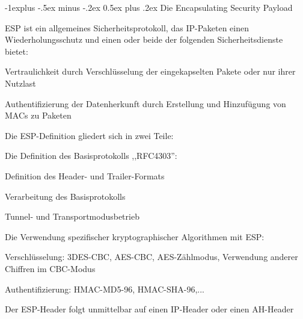 \documentclass[a4paper]{article}
\makeatletter
\renewcommand{\subsection}{\@startsection{subsection}{2}{0mm}%
 {-1explus -.5ex minus -.2ex}%
 {0.5ex plus .2ex}%
 {\normalfont\normalsize\bfseries}}
\makeatother
\begin{document}
\begin{multicols}{3}
      \subsection{Die Encapsulating Security Payload}
      \begin{itemize*}
            \item ESP ist ein allgemeines Sicherheitsprotokoll, das IP-Paketen einen Wiederholungsschutz und einen oder beide der folgenden Sicherheitsdienste bietet:
            \begin{itemize*}
                  \item Vertraulichkeit durch Verschlüsselung der eingekapselten Pakete oder nur ihrer Nutzlast
                  \item Authentifizierung der Datenherkunft durch Erstellung und Hinzufügung von MACs zu Paketen
            \end{itemize*}
            \item Die ESP-Definition gliedert sich in zwei Teile:
            \begin{itemize*}
                  \item Die Definition des Basisprotokolls ,,RFC4303'':
                  \begin{itemize*}
                        \item Definition des Header- und Trailer-Formats
                        \item Verarbeitung des Basisprotokolls
                        \item Tunnel- und Transportmodusbetrieb
                  \end{itemize*}
                  \item Die Verwendung spezifischer kryptographischer Algorithmen mit ESP:
                  \begin{itemize*}
                        \item Verschlüsselung: 3DES-CBC, AES-CBC, AES-Zählmodus, Verwendung anderer Chiffren im CBC-Modus
                        \item Authentifizierung: HMAC-MD5-96, HMAC-SHA-96,...
                  \end{itemize*}
            \end{itemize*}
            \begin{itemize*}
                  \item Der ESP-Header folgt unmittelbar auf einen IP-Header oder einen AH-Header

\end{itemize*}
\end{itemize*}
\end{multicols}
\end{document}

